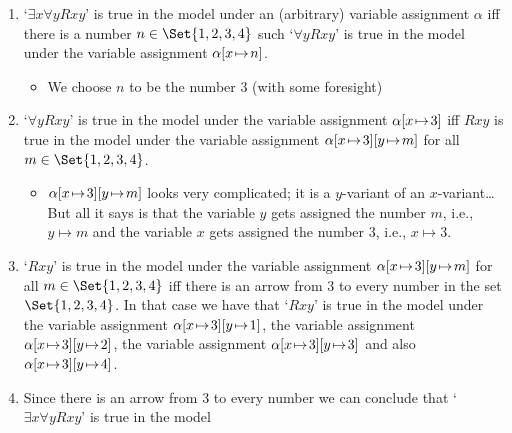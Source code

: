 \begin{enumerate}
	\item  `$\exists x\forall y Rxy$' is true in the model under an (arbitrary) variable assignment $\alpha$ iff there is a number $n\in\Set{1,2,3,4}$ such `$\forall y Rxy$' is true in the model under the variable assignment $\alpha[x \!\mapsto\! n]$. 
	\begin{itemize}
		\item We choose $n$ to be the number 3 (with some foresight)
	\end{itemize}
	\item `$\forall y Rxy$' is true in the model under the variable assignment $\alpha[x \!\mapsto\! 3]$ iff $Rxy$ is true in the model under the variable assignment $\alpha[x \!\mapsto\! 3][y \!\mapsto\! m]$ for all $m\in\Set{1,2,3,4}$.
	\begin{itemize}
		\item $\alpha[x \!\mapsto\! 3][y \!\mapsto\! m]$ looks very complicated; it is a $y$-variant of an $x$-variant\ldots But all it says is that the variable $y$ gets assigned the number $m$, i.e., $y\mapsto m$ and the variable $x$ gets assigned the number $3$, i.e., $x\mapsto 3$.
	\end{itemize}
	\item `$Rxy$' is true in the model under the variable assignment $\alpha[x \!\mapsto\! 3][y \!\mapsto\! m]$ for all $m\in\Set{1,2,3,4}$ iff there is an arrow from $3$ to every number in the set $\Set{1,2,3,4}$. In that case we have that `$Rxy$' is true in the model under the variable assignment $\alpha[x \!\mapsto\! 3][y \!\mapsto\! 1]$, the variable assignment $\alpha[x \!\mapsto\! 3][y \!\mapsto\! 2]$, the variable assignment $\alpha[x \!\mapsto\! 3][y \!\mapsto\! 3]$ and also $\alpha[x \!\mapsto\! 3][y \!\mapsto\! 4]$.
	\item Since there is an arrow from 3 to every number we can conclude that `$\exists x\forall y Rxy$' is true in the model
\end{enumerate}


